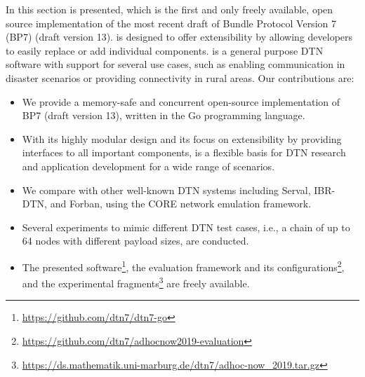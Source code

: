 In this section \dtn is presented, which is the first and only freely available, open source implementation of the most recent draft of Bundle Protocol Version 7 (BP7) (draft version 13).
\dtn is designed to offer extensibility by allowing developers to easily replace or add individual components. 
\dtn is a general purpose DTN software with support for several use cases, such as enabling communication in disaster scenarios or providing connectivity in rural areas. 
Our contributions are:
\begin{itemize}
    \item We provide a memory-safe and concurrent open-source implementation of BP7 (draft version 13), written in the Go programming language.
    \item With its highly modular design and its focus on extensibility by providing interfaces to all important components, \dtn is a flexible basis for DTN research and application development for a wide range of scenarios.
    \item We compare \dtn with other well-known DTN systems including Serval, IBR-DTN, and Forban, using the CORE network emulation framework.
    \item Several experiments to mimic different DTN test cases, i.e., a chain of up to 64 nodes with different payload sizes,
    are conducted.
    \item The presented \dtn 
    software\footnote{\url{https://github.com/dtn7/dtn7-go}},
    the evaluation framework and its 
    configurations\footnote{\url{https://github.com/dtn7/adhocnow2019-evaluation}},
    and the experimental 
    fragments\footnote{\url{https://ds.mathematik.uni-marburg.de/dtn7/adhoc-now_2019.tar.gz}}
    are freely available.
\end{itemize}


